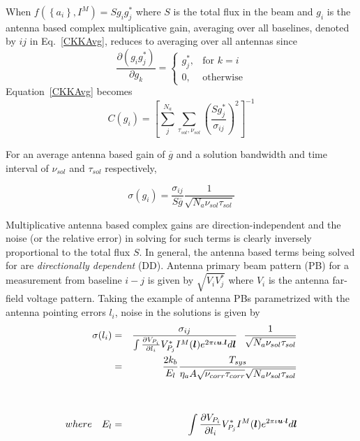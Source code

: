 \documentclass[11pt]{article}
\def\vec#1{\ensuremath{\mathchoice{\mbox{\boldmath$\displaystyle#1$}}
{\mbox{\boldmath$\textstyle#1$}}
{\mbox{\boldmath$\scriptstyle#1$}}
{\mbox{\boldmath$\scriptscriptstyle#1$}}}}
\begin{document}
When $f(\left\{a_i\right\}, I^M)=S g_i g_j^*$ where $S$ is the total
flux in the beam and $g_i$ is the antenna based complex multiplicative
gain, averaging over all baselines, denoted by $ij$ in Eq.~\ref{CKKAvg},
reduces to averaging over all antennas since
\begin{equation}
  \frac{\partial (g_ig_j^*)}{\partial g_k} = 
  \begin{cases}
    g_j^*, &\text{for $k=i$}\\
    0,    &\text{otherwise}
  \end{cases}
\end{equation}
Equation~\ref{CKKAvg} becomes
\begin{equation}
C(g_i) = \left[ \sum^{N_a}_{j} \sum_{\tau_{sol},\nu_{sol}}\left(\frac{Sg^*_j}{\sigma_{ij}}\right)^2  \right]^{-1}
\end{equation}

For an average antenna based gain of $\overline{g}$ and a solution
bandwidth and time interval of $\nu_{sol}$ and $\tau_{sol}$
respectively,

\begin{equation}
\label{DISigma}
\sigma(g_i) = \frac{\sigma_{ij}}{S \overline{g}}\frac{1}{\sqrt{N_a \nu_{sol} \tau_{sol}}}
\end{equation}

Multiplicative antenna based complex gains are direction-independent
and the noise (or the relative error) in solving for such terms is
clearly inversely proportional to the total flux $S$. In general, the
antenna based terms being solved for are {\it directionally dependent}
(DD).  Antenna primary beam pattern (PB) for a measurement from
baseline $i-j$ is given by $\sqrt{V_i V_j^*}$ where $V_i$ is the
antenna far-field voltage pattern.  Taking the example of antenna PBs
parametrized with the antenna pointing errors $l_i$, noise in the
solutions is given by
\begin{eqnarray}
\label{DDSigma1}
\sigma(l_i) &=& \frac{\sigma_{ij}}{\int \frac{\partial V_{P_i}}{\partial l_i} V^*_{P_j} I^M(\vec{l}) e^{2
    \pi \iota \vec{u}.\vec{l}} d\vec{l}}~~\frac{1}{\sqrt{N_a
    \nu_{sol}\tau_{sol}}}\\
\label{DDSigma2}
&=& \frac{2 k_b}{E_l}\frac{T_{sys}}{\eta_a A\sqrt{\nu_{corr}\tau_{corr}}
  \sqrt{N_a \nu_{sol} \tau_{sol}}}\\\nonumber
\\ \nonumber
\\
where~~~E_l &=& \int \frac{\partial V_{P_i}}{\partial l_i} V^*_{P_j} I^M(\vec{l}) e^{2
    \pi \iota \vec{u}\cdot \vec{l}} d\vec{l}
\end{eqnarray}
\end{document}

